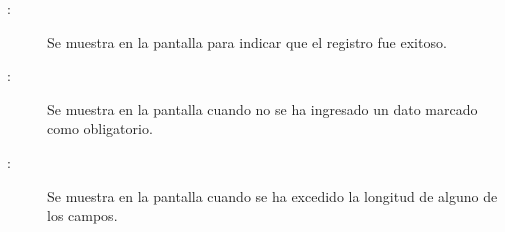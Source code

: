 	
\begin{description}

	\item[ :] Se muestra en la pantalla  para indicar que el registro fue exitoso.
	\item[ :] Se muestra en la pantalla  cuando no se ha ingresado un dato marcado como obligatorio.
	\item[ :] Se muestra en la pantalla  cuando se ha excedido la longitud de alguno de los campos.
\end{description}
